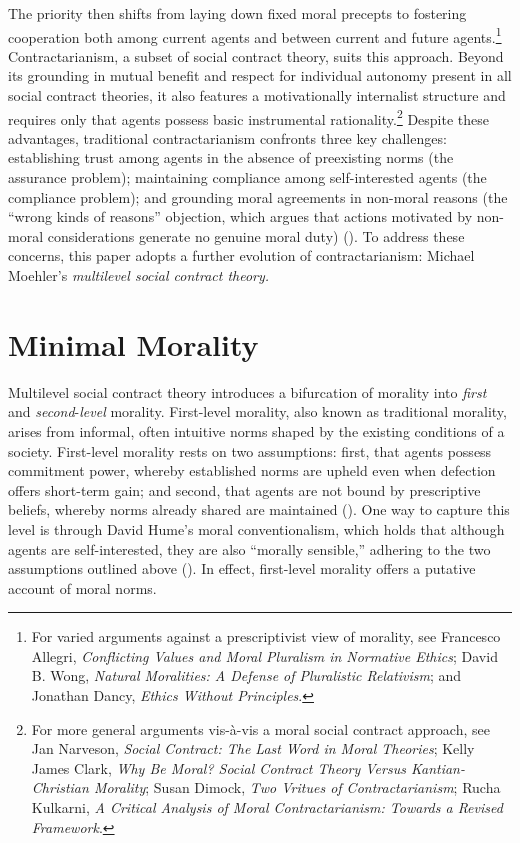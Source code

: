 \documentclass[12pt, a4paper, twoside]{article}
\begin{document}
The priority then shifts from laying down fixed moral precepts to fostering cooperation both among current agents and between current and future agents.\footnote{For varied arguments against a prescriptivist view of morality, see Francesco Allegri, \emph{Conflicting Values and Moral Pluralism in Normative Ethics}; David B. Wong, \emph{Natural Moralities: A Defense of Pluralistic Relativism}; and Jonathan Dancy, \emph{Ethics Without Principles}.} Contractarianism, a subset of social contract theory, suits this approach. Beyond its grounding in mutual benefit and respect for individual autonomy present in all social contract theories, it also features a motivationally internalist structure and requires only that agents possess basic instrumental rationality.\footnote{For more general arguments vis-à-vis a moral social contract approach, see Jan Narveson, \emph{Social Contract: The Last Word in Moral Theories}; Kelly James Clark, \emph{Why Be Moral? Social Contract Theory Versus Kantian-Christian Morality}; Susan Dimock, \emph{Two Vritues of Contractarianism}; Rucha Kulkarni, \emph{A Critical Analysis of Moral Contractarianism: Towards a Revised Framework}.} Despite these advantages, traditional contractarianism confronts three key challenges: establishing trust among agents in the absence of preexisting norms (the assurance problem); maintaining compliance among self-interested agents (the compliance problem); and grounding moral agreements in non-moral reasons (the “wrong kinds of reasons” objection, which argues that actions motivated by non-moral considerations generate no genuine moral duty) (\cites[pp.\ 3–4]{kogelmann2019}[pp.\ 347]{sayremccord2013}[pp.\ 15–16]{moehler2020contractarianism}{prichard1912}). To address these concerns, this paper adopts a further evolution of contractarianism: Michael Moehler’s \emph{multilevel social contract theory.}

\section{Minimal Morality}
\label{sec:minimal_morality}

Multilevel social contract theory introduces a bifurcation of morality into \emph{first} and \emph{second}-\emph{level} morality. First-level morality, also known as traditional morality, arises from informal, often intuitive norms shaped by the existing conditions of a society. First-level morality rests on two assumptions: first, that agents possess commitment power, whereby established norms are upheld even when defection offers short-term gain; and second, that agents are not bound by prescriptive beliefs, whereby norms already shared are maintained (\cites[pp.\ 5–6]{moehler2020contractarianism}[p.\ 229]{moehler2024diversity}). One way to capture this level is through David Hume’s moral conventionalism, which holds that although agents are self-interested, they are also “morally sensible,” adhering to the two assumptions outlined above (\cites{hume1998}[pp.\ 232-233]{moehler2024diversity}). In effect, first-level morality offers a putative account of moral norms.
\end{document}
